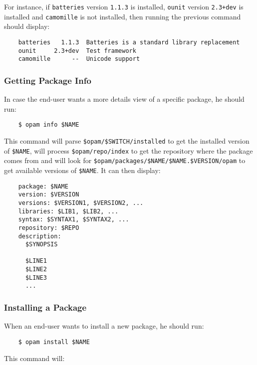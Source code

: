 \documentclass[a4paper,10pt]{article}
\begin{document}
For instance, if {\tt batteries} version {\tt 1.1.3} is installed,
{\tt ounit} version {\tt 2.3+dev} is installed and {\tt camomille} is
not installed, then running the previous command should display:

\begin{verbatim}
    batteries   1.1.3  Batteries is a standard library replacement
    ounit     2.3+dev  Test framework
    camomille      --  Unicode support
\end{verbatim}

\subsubsection{Getting Package Info}

In case the end-user wants a more details view of a specific package,
he should run:

\begin{verbatim}
    $ opam info $NAME
\end{verbatim}

This command will parse \verb+$opam/$SWITCH/installed+ to get the
installed version of \verb+$NAME+, will process
\verb+$opam/repo/index+ to get the repository where the package comes
from and will look for \verb+$opam/packages/$NAME/$NAME.$VERSION/opam+
to get available versions of \verb+$NAME+. It can then display:

\begin{verbatim}
    package: $NAME
    version: $VERSION
    versions: $VERSION1, $VERSION2, ...
    libraries: $LIB1, $LIB2, ...
    syntax: $SYNTAX1, $SYNTAX2, ...
    repository: $REPO
    description:
      $SYNOPSIS

      $LINE1
      $LINE2
      $LINE3
      ...
\end{verbatim}

\subsubsection{Installing a Package}
\label{opam-install}

When an end-user wants to install a new package, he should run:

\begin{verbatim}
    $ opam install $NAME
\end{verbatim}

This command will:
\end{document}

